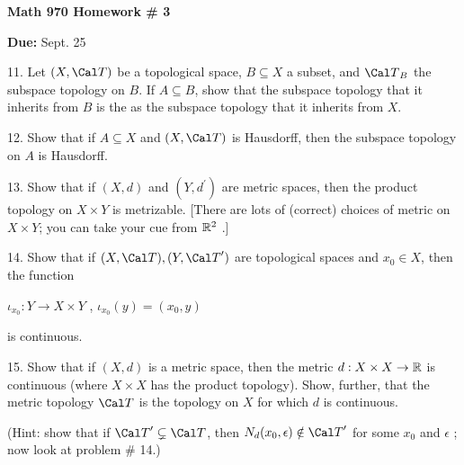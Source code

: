 


\def\ctln{\centerline}
\def\msk{\medskip}
\def\bsk{\bigskip}
\def\ssk{\smallskip}
\def\u{\underbar}

\UseAMSsymbols

\ctln{\bf Math 970 Homework \# 3}

\msk

\ctln{{\bf Due: }Sept. 25}

\bsk


\item{11.} Let $(X,{\Cal T})$ be a topological space, $B\subseteq X$ a subset, and 
${\Cal T}_B$ the subspace topology on $B$. If $A\subseteq B$, show that the subspace
topology that it inherits from $B$ is the \u{same} as the subspace topology that it
inherits from $X$.

\bsk

\item{12.} Show that if $A\subseteq X$ and $(X,{\Cal T})$ is Hausdorff, then the
subspace topology on $A$ is Hausdorff.

\bsk

\item{13.} Show that if $(X,d)$ and $(Y,d^\prime)$ are metric spaces, then the product
topology on $X\times Y$ is metrizable. [There are lots of (correct) choices of metric on 
$X\times Y$; you can take your cue from ${\Bbb R}^2$ .]

\bsk

\item{14.} Show that if $(X,{\Cal T}), (Y,{\Cal T}^\prime)$ are topological spaces and $x_0\in X$, then
the function 

\ssk

\ctln{${\iota}_{x_0} : Y\rightarrow X\times Y$ , ${\iota}_{x_0}(y) = (x_0,y)$}

\ssk

\item{} is continuous.

\bsk

\item{15.} Show that if $(X,d)$ is a metric space, then the metric $d : X\times X\rightarrow 
{\Bbb R}$ is continuous (where $X\times X$ has the product topology). Show, further, that
the metric topology ${\Cal T}$ is the \u{coarsest} topology on $X$ for which $d$ is continuous.

\ssk

\item{} (Hint: show that if ${\Cal T}^\prime\subsetneq {\Cal T}$, then $N_d(x_0,\epsilon)\notin{\Cal T}^\prime$
for some $x_0$ and $\epsilon$ ; now look at problem \# 14.)

